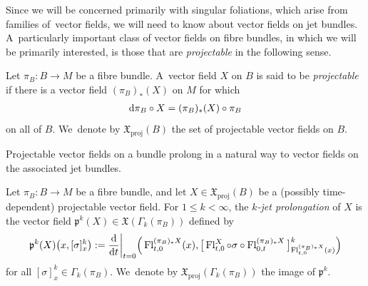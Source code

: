 \documentclass[10pt,a4paper]{amsart}
\numberwithin{equation}{section}
\def\proj{\operatorname{proj}}
\def\Fl{\operatorname{Fl}}
\def\XF{{\mathfrak{X}}}
\def\pf{{\mathfrak{p}}}
\begin{document}
Since we will be concerned primarily with singular foliations, which arise from families of~vec\-tor fields, we will need to know about vector fields on jet bundles. A~particularly important class of vector fields on fibre bundles, in which we will be primarily interested, is those that are \textit{projectable} in the following sense.

\begin{Definition}%
Let $\pi_{B}\colon B\rightarrow M$ be a fibre bundle. A~vector field $X$ on $B$ is said to be \textit{pro\-jec\-table} if there is a vector field $(\pi_{B})_{*}(X)$ on $M$ for which
\begin{gather}\label{projectableeqn}
{\rm d}\pi_{B}\circ X = (\pi_{B})_{*}(X)\circ \pi_{B}
\end{gather}
on all of $B$. We~denote by $\XF_{\proj}(B)$ the set of projectable vector fields on $B$.
\end{Definition}

Projectable vector fields on a bundle prolong in a natural way to vector fields on the associated jet bundles.

\begin{Definition}
Let $\pi_{B}\colon B\rightarrow M$ be a fibre bundle, and let $X\in\XF_{\proj}(B)$ be a (possibly time-dependent) projectable vector field. For $1\leq k<\infty$, the \textit{$k$-jet prolongation} of $X$ is the vector field $\pf^{k}(X)\in\XF(\Gamma_{k}(\pi_{B}))$ defined by
\begin{gather*}
\pf^{k}(X)\big(x,[\sigma]^{k}_{x}\big):=\frac{\rm d}{{\rm d}t}\bigg|_{t=0}\Big(\Fl^{(\pi_{B})_{*}X}_{t,0}(x),\big[\Fl^{X}_{t,0}\circ \sigma\circ\Fl^{(\pi_{B})_{*}X}_{0,t}\big]^{k}_{\Fl^{(\pi_{B})_{*}X}_{t,0}(x)}\Big)
\end{gather*}
for all $[\sigma]^{k}_{x}\in \Gamma_{k}(\pi_{B})$. We~denote by $\XF_{\proj}(\Gamma_{k}(\pi_{B}))$ the image of $\pf^{k}$.
\end{Definition}
\end{document}
